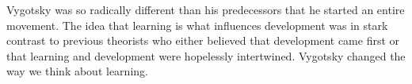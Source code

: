 \documentclass[12pt]{article}
\begin{document}
Vygotsky was so radically different than his predecessors that he started an entire movement. The idea that learning is what influences development was in stark contrast to previous theorists who either believed that development came first or that learning and development were hopelessly intertwined. Vygotsky changed the way we think about learning.

\clearpage
\begin{center}
    {\LARGE }
\end{center}

\end{document}
